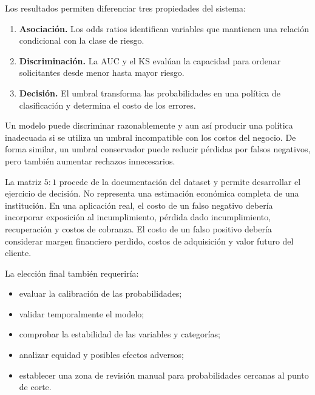 Los resultados permiten diferenciar tres propiedades del sistema:

\begin{enumerate}
    \item \textbf{Asociación.} Los odds ratios identifican variables que
    mantienen una relación condicional con la clase de riesgo.

    \item \textbf{Discriminación.} La AUC y el KS evalúan la capacidad
    para ordenar solicitantes desde menor hasta mayor riesgo.

    \item \textbf{Decisión.} El umbral transforma las probabilidades en
    una política de clasificación y determina el costo de los errores.
\end{enumerate}

Un modelo puede discriminar razonablemente y aun así producir una política
inadecuada si se utiliza un umbral incompatible con los costos del
negocio. De forma similar, un umbral conservador puede reducir pérdidas
por falsos negativos, pero también aumentar rechazos innecesarios.

La matriz \(5:1\) procede de la documentación del dataset y permite
desarrollar el ejercicio de decisión. No representa una estimación
económica completa de una institución. En una aplicación real, el costo
de un falso negativo debería incorporar exposición al incumplimiento,
pérdida dado incumplimiento, recuperación y costos de cobranza. El costo
de un falso positivo debería considerar margen financiero perdido,
costos de adquisición y valor futuro del cliente.

La elección final también requeriría:

\begin{itemize}
    \item evaluar la calibración de las probabilidades;

    \item validar temporalmente el modelo;

    \item comprobar la estabilidad de las variables y categorías;

    \item analizar equidad y posibles efectos adversos;

    \item establecer una zona de revisión manual para probabilidades
    cercanas al punto de corte.
\end{itemize}

